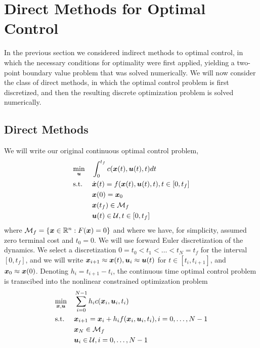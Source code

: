 \chapter{Direct Methods for Optimal Control}

In the previous section we considered indirect methods to optimal control, in which the necessary conditions for optimality were first applied, yielding a two-point boundary value problem that was solved numerically. We will now consider the class of direct methods, in which the optimal control problem is first discretized, and then the resulting discrete optimization problem is solved numerically. 

\section{Direct Methods}

We will write our original continuous optimal control problem,
\begin{equation}
\begin{aligned}
\label{eq:ocp}
& \underset{\bm{u}}{\min} & & \int_0^{t_f} c(\bm{x}(t),\bm{u}(t),t) dt \\
& \textrm{s.t.} & & \dot{\bm{x}}(t) = f(\bm{x}(t), \bm{u}(t),t), t \in [0, t_f]\\
& & & \bm{x}(0) = \bm{x}_0\\
& & & \bm{x}(t_f) \in \mathcal{M}_f\\
& & & \bm{u}(t) \in \mathcal{U}, t\in [0,t_f]
\end{aligned}
\end{equation}
where $\mathcal{M}_f = \{\bm{x}\in \mathbb{R}^n : F(\bm{x}) = 0\}$ and where we have, for simplicity, assumed zero terminal cost and $t_0 = 0$. We will use forward Euler discretization of the dynamics. We select a discretization $0 = t_0 < t_1 < \ldots < t_N = t_f$ for the interval $[0,t_f]$, and we will write $\bm{x}_{i+1} \approx \bm{x}(t), \bm{u}_i \approx \bm{u}(t)$ for $t \in [t_i, t_{i+1}]$, and $\bm{x}_0 \approx \bm{x}(0)$. Denoting $h_i = t_{i+1} - t_i$, the continuous time optimal control problem is transcibed into the nonlinear constrained optimization problem 
\begin{equation}
\begin{aligned}
\label{eq:nlop}
& \underset{\bm{x},\bm{u}}{\min} & & \sum_{i=0}^{N-1} h_i c(\bm{x}_i,\bm{u}_i,t_i) \\
& \textrm{s.t.} & & \bm{x}_{i+1} = \bm{x}_i + h_i f(\bm{x}_i,\bm{u}_i,t_i), i = 0, \ldots, N-1\\
& & & \bm{x}_N \in \mathcal{M}_f\\
& & & \bm{u}_i \in \mathcal{U}, i = 0, \ldots, N-1
\end{aligned}
\end{equation}

